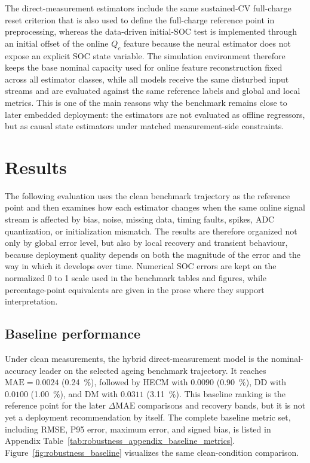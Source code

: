 \documentclass[
    a4paper,
    12pt,
    titlepage,
    bibliography=totoc,
    twoside=on,
    parskip=false,
    numbers=noenddot,
    cleardoublepage=empty,
    DIV=12,
    BCOR=12.0mm,
    headheight=36pt,
    headings=openright
]{scrreprt}
\begin{document}
The direct-measurement estimators include the same sustained-CV full-charge reset criterion that is also used to define the full-charge reference point in preprocessing, whereas the data-driven initial-SOC test is implemented through an initial offset of the online $Q_c$ feature because the neural estimator does not expose an explicit SOC state variable. The simulation environment therefore keeps the base nominal capacity used for online feature reconstruction fixed across all estimator classes, while all models receive the same disturbed input streams and are evaluated against the same reference labels and global and local metrics. This is one of the main reasons why the benchmark remains close to later embedded deployment: the estimators are not evaluated as offline regressors, but as causal state estimators under matched measurement-side constraints.

\section{Results}
The following evaluation uses the clean benchmark trajectory as the reference point and then examines how each estimator changes when the same online signal stream is affected by bias, noise, missing data, timing faults, spikes, ADC quantization, or initialization mismatch. The results are therefore organized not only by global error level, but also by local recovery and transient behaviour, because deployment quality depends on both the magnitude of the error and the way in which it develops over time. Numerical SOC errors are kept on the normalized 0 to 1 scale used in the benchmark tables and figures, while percentage-point equivalents are given in the prose where they support interpretation.

\subsection{Baseline performance}
Under clean measurements, the hybrid direct-measurement model is the nominal-accuracy leader on the selected ageing benchmark trajectory. It reaches $\mathrm{MAE}=0.0024$ (\SI{0.24}{\percent}), followed by HECM with $0.0090$ (\SI{0.90}{\percent}), DD with $0.0100$ (\SI{1.00}{\percent}), and DM with $0.0311$ (\SI{3.11}{\percent}). This baseline ranking is the reference point for the later $\Delta\mathrm{MAE}$ comparisons and recovery bands, but it is not yet a deployment recommendation by itself. The complete baseline metric set, including RMSE, P95 error, maximum error, and signed bias, is listed in Appendix Table~\ref{tab:robustness_appendix_baseline_metrics}. Figure~\ref{fig:robustness_baseline} visualizes the same clean-condition comparison.
\end{document}

